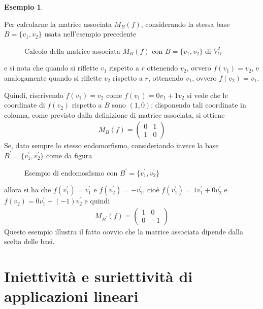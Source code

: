 \documentclass{book}
\theoremstyle{definition}
\newtheorem{es}{Esempio}[section]
\theoremstyle{plain}
\begin{document}
\begin{es}
\begin{enumerate}
    Per calcolarne la matrice associata $M_B(f)$, considerando la stessa base $B=\{v_1,v_2\}$
    usata nell'esempio precedente
    \clearpage
    \begin{figure}[ht!]
      \centering
      \resizebox{5cm}{!}{}
      \caption{Calcolo della matrice associata $M_B(f)$ con $B=\{v_1,v_2\}$ di $V_O^2$}
      \label{fig:mtxAsaplin8}
    \end{figure}
    e si nota che quando si riflette $v_1$ rispetto a $r$ ottenendo $v_2$, ovvero $f(v_1)=v_2$,
    e analogamente quando si riflette $v_2$ rispetto a $r$, ottenendo $v_1$, ovvero $f(v_2)=v_1$.

    Quindi, riscrivendo $f(v_1)=v_2$ come $f(v_1)=0v_1+1v_2$ si vede che le coordinate di $f(v_2)$
    rispetto a $B$ sono $(1,0)$: disponendo tali coordinate in colonna, come previsto dalla
    definizione di matrice associata, si ottiene
    \begin{eqnarray*}
      M_B(f)=
      \begin{pmatrix}
        0 & 1 \\
        1 & 0
      \end{pmatrix}
    \end{eqnarray*}
    Se, dato sempre lo stesso endomorfismo, consideriando invece la base $B^\prime=\{v_1^\prime,
    v_2^\prime\}$ come da figura
    \begin{figure}[ht!]
      \centering
      \resizebox{5cm}{!}{}
      \caption{Esempio di endomosfismo con $B^\prime=\{v_1^\prime,v_2^\prime\}$}
      \label{fig:mtxAsaplin9}
    \end{figure}

    allora si ha che $f(v_1^\prime)=v_1^\prime$ e $f(v_2^\prime)=-v_2^\prime$, cioè $f(v_1^\prime)
    =1v_1^\prime+0v_2^\prime$ e $f(v_2)=0v_1^\prime+(-1)v_2^\prime$ e quindi
    \begin{eqnarray*}
      M_{B^\prime}(f)=
      \begin{pmatrix}
        1 & 0 \\
        0 & -1
      \end{pmatrix}
    \end{eqnarray*}
    Questo esempio illustra il fatto oovvio che la matrice associata dipende dalla scelta delle
    basi.
  \end{enumerate}
\end{es}

\section{Iniettività e suriettività di applicazioni lineari}
\label{sec:inietesuriet}
\end{document}
